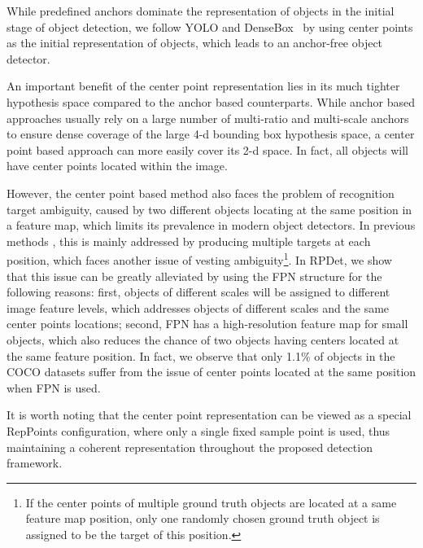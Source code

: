 \documentclass[10pt,twocolumn,letterpaper]{article}
\begin{document}
While predefined anchors dominate the representation of objects in the initial stage of object detection, we follow YOLO \cite{YOLO} and DenseBox~\cite{DenseBox} by using center points as the initial representation of objects, which leads to an anchor-free object detector.

An important benefit of the center point representation lies in its much tighter hypothesis space compared to the anchor based counterparts. While anchor based approaches usually rely on a large number of multi-ratio and multi-scale anchors to ensure dense coverage of the large 4-d bounding box hypothesis space, a center point based approach can more easily cover its 2-d space. In fact, all objects will have center points located within the image.

However, the center point based method also faces the problem of recognition target ambiguity, caused by two different objects locating at the same position in a feature map, which limits its prevalence in modern object detectors. In previous methods \cite{YOLO}, this is mainly addressed by producing multiple targets at each position, which faces another issue of vesting ambiguity\footnote{If the center points of multiple ground truth objects are located at a same feature map position, only one randomly chosen ground truth object is assigned to be the target of this position.}. In RPDet, we show that this issue can be greatly alleviated by using the FPN structure \cite{FPN} for the following reasons: first, objects of different scales will be assigned to different image feature levels, which addresses objects of different scales and the same center points locations; second, FPN has a high-resolution feature map for small objects, which also reduces the chance of two objects having centers located at the same feature position. In fact, we observe that only 1.1\% of objects in the COCO datasets \cite{MSCOCO} suffer from the issue of center points located at the same position when FPN is used.  


It is worth noting that the center point representation can be viewed as a special RepPoints configuration, where only a single fixed sample point is used, thus maintaining a coherent representation throughout the proposed detection framework.

\vspace{-5pt}
\end{document}
